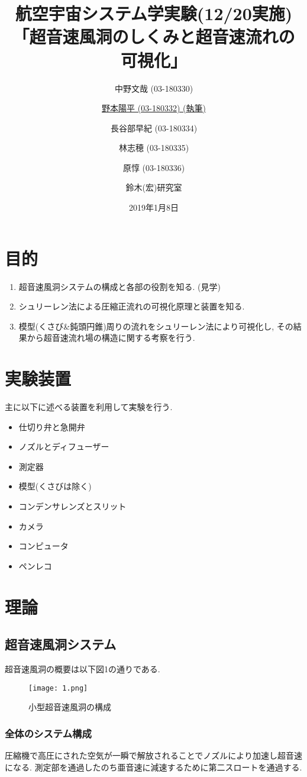 \documentclass[12pt]{jsarticle}
\title{\Huge{航空宇宙システム学実験(12/20実施) \newline「超音速風洞のしくみと超音速流れの可視化」}}
\author{\large{中野文哉 (03-180330)} \and \large{\underline{野本陽平 (03-180332) (執筆)}} \and \large{長谷部早紀 (03-180334)} \and \large{林志穂 (03-180335)} \and \large{原惇 (03-180336)} \and \large{鈴木(宏)研究室}}
\date{\large{2019年1月8日}}
\begin{document}
\maketitle
\newpage

\section{目的}
\begin{enumerate}
\item 超音速風洞システムの構成と各部の役割を知る. (見学)
\item シュリーレン法による圧縮正流れの可視化原理と装置を知る.
\item 模型(くさび\&鈍頭円錐)周りの流れをシュリーレン法により可視化し, その結果から超音速流れ場の構造に関する考察を行う.
\end{enumerate}

\section{実験装置}
主に以下に述べる装置を利用して実験を行う.
\begin{multicols}{2}
\begin{itemize}
\item 仕切り弁と急開弁
\item ノズルとディフューザー
\item 測定器
\item 模型(くさびは除く)
\item コンデンサレンズとスリット
\item カメラ
\item コンピュータ
\item ペンレコ
\end{itemize}
\end{multicols}

\section{理論}
\subsection{超音速風洞システム}
超音速風洞の概要は以下図1の通りである.
\begin{figure}[htbp]
\begin{center}
\texttt{[image: 1.png]}
\caption{小型超音速風洞の構成}
\end{center}
\end{figure}
\newpage
\subsubsection{全体のシステム構成}
圧縮機で高圧にされた空気が一瞬で解放されることでノズルにより加速し超音速になる. 測定部を通過したのち亜音速に減速するために第二スロートを通過する.
 
\end{document}
